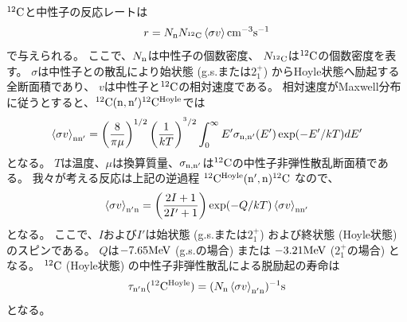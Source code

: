 ${}^{12}{\rm C}$と中性子の反応レートは
\begin{equation}
  r = N_{\rm n}N_{{}^{12}{\rm C}}\braket{\sigma v} {\rm cm}^{-3}{\rm s}^{-1}
  \label{eq::r}
\end{equation}
で与えられる。
ここで、$N_{{\rm n}}$は中性子の個数密度、
$N_{{}^{12}{\rm C}}$は${}^{12}{\rm C}$の個数密度を表す。
$\sigma$は中性子との散乱により始状態 (g.s.または$2_{1}^{+}$) からHoyle状態へ励起する全断面積であり、
$v$は中性子と${}^{12}{\rm C}$の相対速度である。
相対速度がMaxwell分布に従うとすると、${}^{12}{\rm C}({\rm n},{\rm n'}){}^{12}{\rm C}^{{\rm Hoyle}}$では
\begin{equation}
  \braket{\sigma v}_{\rm nn'} =
  \left(\frac{8}{\pi\mu}\right)^{1/2}\left(\frac{1}{kT}\right)^{^3/2}
  \int^{\infty}_{0}E'\sigma_{\rm n,n'}(E')\exp(-E'/kT)dE'
  \label{eq::sigmann'}
\end{equation}
となる。
$T$は温度、$\mu$は換算質量、$\sigma_{\rm n,n'}$は${}^{12}{\rm C}$の中性子非弾性散乱断面積である。
我々が考える反応は上記の逆過程 ${}^{12}{\rm C}^{{\rm Hoyle}}({\rm n',n}){}^{12}{\rm C}$ なので、
\begin{equation}
  \braket{\sigma v}_{\rm n'n} = \left(\frac{2I+1}{2I'+1}\right)
  \exp(-Q/kT)\braket{\sigma v}_{\rm nn'}
  \label{eq::sigman'n}
\end{equation}
となる。
ここで、$I$および$I'$は始状態 (g.s.または$2_{1}^{+}$)
および終状態 (Hoyle状態) のスピンである。
$Q$は$-7.65{\rm MeV}$ (g.s.の場合) または
$-3.21{\rm MeV}$ ($2_{1}^{+}$の場合) となる。
${}^{12}{\rm C}$ (Hoyle状態) の中性子非弾性散乱による脱励起の寿命は
\begin{equation}
  \tau_{\rm n'n}({}^{12}{\rm C}^{{\rm Hoyle}}) =
  (N_{\rm n}\braket{\sigma v}_{\rm n'n})^{-1} {\rm s}
  \label{eq::tau}
\end{equation}
となる。

